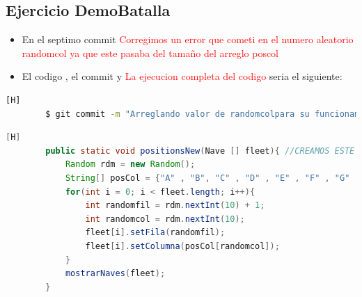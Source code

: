 \documentclass{article}
\begin{document}
    \subsection{Ejercicio DemoBatalla}
	\begin{itemize}	
		\item En el septimo commit \textcolor{red}{Corregimos un error que cometi en el numero aleatorio randomcol ya que este pasaba del tamaño del arreglo poscol}
		\item El codigo , el commit y \textcolor{red}{La ejecucion completa del codigo} seria el siguiente:
	\end{itemize}
	\begin{lstlisting}[language=bash,caption={Commit}][H]
		$ git commit -m "Arreglando valor de randomcolpara su funcionamiento ya que pasaba del numero de elementos del arreglo poscol"
	\end{lstlisting}
	\begin{lstlisting}[language=java,caption={Las lineas de codigo del metodo creado:}][H]
        public static void positionsNew(Nave [] fleet){ //CREAMOS ESTE METODO positionsNew DONDE PONEMOS EN UBICACIONES ALEATORIAS NUESTRAS NAVES QUE YA HABIAN SIDO INGRESADAS NOS AYUDAMOS CON LA CLASE RANDOM DONDE ESTA NOS PERMITE INTERCAMBIAR POSICIONES Y TAMBIEN CREAMOS UN ARRAY DE STRINGS DONDE SERIAN LAS POSICIONES DE LAS COLUMNAS Y ESTAS TAMBIEN PUEDAN CAMBIAR DESPUES MOSTRAMOS LOS RESULTADOS 
            Random rdm = new Random();
            String[] posCol = {"A" , "B", "C" , "D" , "E" , "F" , "G" , "H" , "I" , "J"};
            for(int i = 0; i < fleet.length; i++){
                int randomfil = rdm.nextInt(10) + 1;
                int randomcol = rdm.nextInt(10);
                fleet[i].setFila(randomfil);
                fleet[i].setColumna(posCol[randomcol]);
            }
            mostrarNaves(fleet);
        }
	\end{lstlisting}
\end{document}
